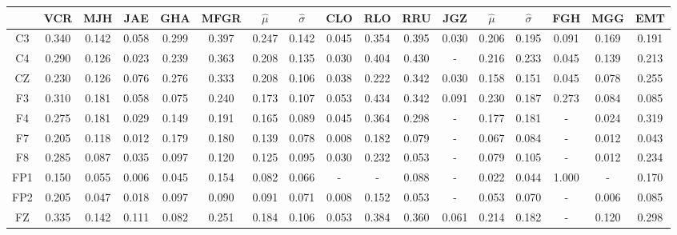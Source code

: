 \begin{SidewaysFigure}
\centering
\begin{tabular}{c||ccccc|cc||cccc|cc||ccc}
& VCR & MJH & JAE & GHA & MFGR &$\widehat{\mu}$ & $\widehat{\sigma}$
& CLO & RLO & RRU & JGZ &$\widehat{\mu}$ & $\widehat{\sigma}$
& FGH & MGG & EMT \\
\hline
 C3 & 0.340    & 0.142    & 0.058    & 0.299    & 0.397    & 0.247    & 0.142    & 0.045    & 0.354    & 0.395    & 0.030    & 0.206    & 0.195    & 0.091    & 0.169    & 0.191     \\
 C4 & 0.290    & 0.126    & 0.023    & 0.239    & 0.363    & 0.208    & 0.135    & 0.030    & 0.404    & 0.430    & -      & 0.216    & 0.233    & 0.045    & 0.139    & 0.213     \\
 CZ & 0.230    & 0.126    & 0.076    & 0.276    & 0.333    & 0.208    & 0.106    & 0.038    & 0.222    & 0.342    & 0.030    & 0.158    & 0.151    & 0.045    & 0.078    & 0.255     \\
 F3 & 0.310    & 0.181    & 0.058    & 0.075    & 0.240    & 0.173    & 0.107    & 0.053    & 0.434    & 0.342    & 0.091    & 0.230    & 0.187    & 0.273    & 0.084    & 0.085     \\
 F4 & 0.275    & 0.181    & 0.029    & 0.149    & 0.191    & 0.165    & 0.089    & 0.045    & 0.364    & 0.298    & -      & 0.177    & 0.181    & -      & 0.024    & 0.319     \\
 F7 & 0.205    & 0.118    & 0.012    & 0.179    & 0.180    & 0.139    & 0.078    & 0.008    & 0.182    & 0.079    & -      & 0.067    & 0.084    & -      & 0.012    & 0.043     \\
 F8 & 0.285    & 0.087    & 0.035    & 0.097    & 0.120    & 0.125    & 0.095    & 0.030    & 0.232    & 0.053    & -      & 0.079    & 0.105    & -      & 0.012    & 0.234     \\
 FP1 & 0.150    & 0.055    & 0.006    & 0.045    & 0.154    & 0.082    & 0.066    & -      & -      & 0.088    & -      & 0.022    & 0.044    & 1.000    & -      & 0.170     \\
 FP2 & 0.205    & 0.047    & 0.018    & 0.097    & 0.090    & 0.091    & 0.071    & 0.008    & 0.152    & 0.053    & -      & 0.053    & 0.070    & -      & 0.006    & 0.085     \\
 FZ & 0.335    & 0.142    & 0.111    & 0.082    & 0.251    & 0.184    & 0.106    & 0.053    & 0.384    & 0.360    & 0.061    & 0.214    & 0.182    & -      & 0.120    & 0.298     \\

\end{tabular}
\end{SidewaysFigure}
